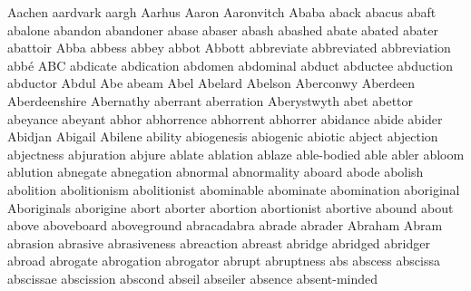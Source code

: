 Aachen aardvark aargh Aarhus Aaron Aaronvitch Ababa aback abacus abaft abalone abandon abandoner abase abaser abash abashed abate abated abater abattoir Abba abbess abbey abbot Abbott abbreviate abbreviated abbreviation abbé ABC abdicate abdication abdomen abdominal abduct abductee abduction abductor Abdul Abe abeam Abel Abelard Abelson Aberconwy Aberdeen Aberdeenshire Abernathy aberrant aberration Aberystwyth abet abettor abeyance abeyant abhor abhorrence abhorrent abhorrer abidance abide abider Abidjan Abigail Abilene ability abiogenesis abiogenic abiotic abject abjection abjectness abjuration abjure ablate ablation ablaze able-bodied able abler abloom ablution abnegate abnegation abnormal abnormality aboard abode abolish abolition abolitionism abolitionist abominable abominate abomination aboriginal Aboriginals aborigine abort aborter abortion abortionist abortive abound about above aboveboard aboveground abracadabra abrade abrader Abraham Abram abrasion abrasive abrasiveness abreaction abreast abridge abridged abridger abroad abrogate abrogation abrogator abrupt abruptness abs abscess abscissa abscissae abscission abscond abseil abseiler absence absent-minded 